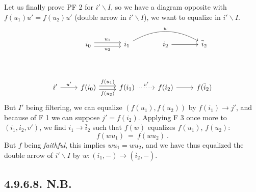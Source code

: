\documentclass[11pt]{article}
\newcommand{\bs}{\backslash}
\begin{document}
Let us finally prove PF 2 for $i'\bs I$, so we have a diagram opposite with $f(u_1)u' = f(u_2)u'$ (double arrow in $i'\bs I$), we want to equalize in $i'\bs I$.
\[
\begin{tikzcd}
{} & i_0 \arrow[r, shift left, "u_1"] \arrow[r, shift right, "u_2"'] & i_1 \arrow[rr, bend left, "w"] & i_2 \arrow[r] & \bar{i}_2 \\
{} & {} & {} & {} & {} \\
i' \arrow[r, "u'"] & f(i_0) \arrow[r, shift left, "f(u_1)"] \arrow[r, shift right, "f(u_2)"'] & f(i_1) \arrow[r, dotted, "v'"] & f(i_2) \arrow[r] & f(\bar{i}_2)
\end{tikzcd}
\]
But $I'$ being filtering, we can equalize $(f(u_1), f(u_2))$ by $f(i_1) \longrightarrow j'$, and because of F 1 we can suppose $j' = f(i_2)$. Applying F 3 once more to $(i_1, i_2, v')$, we find $i_1 \longrightarrow \bar{i}_2$ such that $f(w)$ equalizes $f(u_1)$, $f(u_2)$:
\[
f(wu_1) \ = \ f(wu_2) \ .
\]
But $f$ being \textit{faithful}, this implies $wu_1 = wu_2$, and we have thus equalized the double arrow of $i'\bs I$ by $w : (i_1, -) \longrightarrow (\bar{i}_2, -)$.

\subsection*{4.9.6.8. N.B.}
\end{document}

